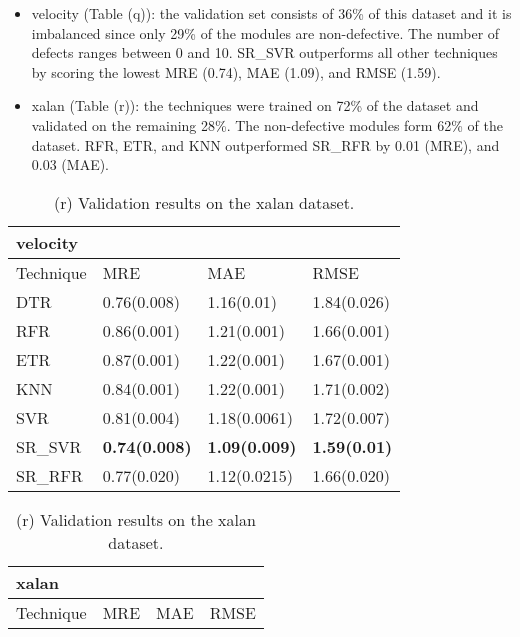 \documentclass[]{article}
\begin{document}
	\begin{itemize}
	\item velocity (Table (q)): the validation set consists of 36\% of this dataset and it is imbalanced since only 29\% of the modules are non-defective. The number of defects ranges between 0 and 10. SR\_SVR outperforms all other techniques by scoring the lowest MRE (0.74), MAE (1.09), and RMSE (1.59).
	\item xalan (Table (r)): the techniques were trained on 72\% of the dataset and validated on the remaining 28\%. The non-defective modules form 62\% of the dataset. RFR, ETR, and KNN outperformed SR\_RFR by 0.01 (MRE), and 0.03 (MAE).
\end{itemize}
		\begin{table}[h]
		\captionsetup[subtable]{labelformat=empty}
		\begin{adjustwidth}{-3.4cm}{}
			\begin{subtable}{9.5cm}
				\centering
				\caption{(q) Validation results on the velocity dataset.}
				\label{tab:xalan-wv}
				\begin{tabular}{llll}
					\hline
					velocity &             &              &             \\ \hline
					Technique    & MRE         & MAE          & RMSE        \\ \hline
					DTR          & 0.76(0.008) & 1.16(0.01) & 1.84(0.026) \\
					RFR          & 0.86(0.001) & 1.21(0.001) & 1.66(0.001) \\
					ETR          & 0.87(0.001) & 1.22(0.001) & 1.67(0.001) \\
					KNN          & 0.84(0.001) & 1.22(0.001) & 1.71(0.002) \\
					SVR          & 0.81(0.004) & 1.18(0.0061) & 1.72(0.007) \\
					SR\_SVR       & \bfseries 0.74(0.008) & \bfseries 1.09(0.009) & \bfseries 1.59(0.01) \\
					SR\_RFR       & 0.77(0.020) & 1.12(0.0215) & 1.66(0.020) \\ \hline
				\end{tabular}
			\end{subtable}
			\begin{subtable}{9.5cm}
				\centering
				\caption{(r) Validation results on the xalan dataset.}
				\label{tab:xerces-wv}
				\begin{tabular}{llll}
					\hline
					xalan &              &              &              \\ \hline
					Technique & MRE          & MAE          & RMSE         \\ \hline

\end{tabular}
\end{subtable}
\end{adjustwidth}
\end{table}
\end{document}
